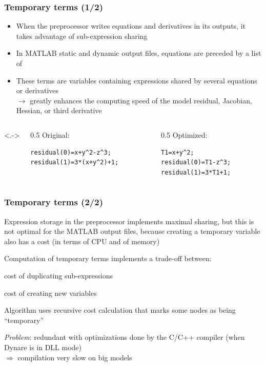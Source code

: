\documentclass[handout,usepdftitle=false,xcolor=dvipsnames,aspectratio=169]{beamer}
\begin{document}
\begin{frame}[fragile]
  \frametitle{Temporary terms (1/2)}
  \begin{itemize}
  \item When the preprocessor writes equations and derivatives in its outputs, it takes advantage of sub-expression sharing
  \item In MATLAB static and dynamic output files, equations are preceded by a list of 
  \item These terms are variables containing expressions shared by several equations or derivatives\\
  $\rightarrow$ greatly enhances the computing speed of the model residual, Jacobian, Hessian, or third derivative
  \end{itemize}
  \begin{columns}<.->
\begin{column}[T]{0.5\textwidth}
Original:
\begin{verbatim}
residual(0)=x+y^2-z^3;
residual(1)=3*(x+y^2)+1;
\end{verbatim}
\end{column}
\begin{column}[T]{0.5\textwidth}
Optimized:
\begin{verbatim}
T1=x+y^2;
residual(0)=T1-z^3;
residual(1)=3*T1+1;
\end{verbatim}
\end{column}
\end{columns}
\end{frame}

\begin{frame}
  \frametitle{Temporary terms (2/2)}
  \begin{witemize}
  \item Expression storage in the preprocessor implements maximal sharing, but this is not optimal for the MATLAB output files, because creating a temporary variable also has a cost (in terms of CPU and of memory)
  \item Computation of temporary terms implements a trade-off between:
    \begin{witemize}
    \item cost of duplicating sub-expressions
    \item cost of creating new variables
    \end{witemize}
  \item Algorithm uses recursive cost calculation that marks some nodes as being ``temporary''
  \item \textit{Problem}: redundant with optimizations done by the C/C++ compiler (when Dynare is in DLL mode)\\
   $\Rightarrow$ compilation very slow on big models
  \end{witemize}
\end{frame}
\end{document}
